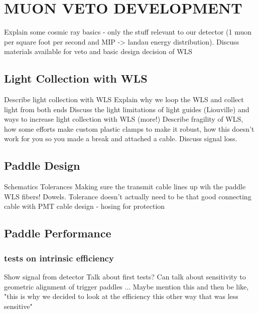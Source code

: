 %
%
%
%
%
%
%
%

%
%

\chapter{MUON VETO DEVELOPMENT}
\label{chap:muVeto}
Explain some cosmic ray basics - only the stuff relevant to our detector (1 muon per square foot per second and MIP -> landau energy distribution).
Discuss materials available for veto and basic design decision of WLS

\section{Light Collection with WLS}
Describe light collection with WLS
Explain why we loop the WLS and collect light from both ends
Discuss the light limitations of light guides (Liouville) and ways to increase light collection with WLS (more!)
Describe fragility of WLS, how some efforts make custom plastic clamps to make it robust, how this doesn't work for you so you made a break and attached a cable.  Discuss signal loss.

\section{Paddle Design}
Schematics
Tolerances
Making sure the transmit cable lines up wih the paddle WLS fibers!  Dowels.  Tolerance doesn't actually need to be that good
connecting cable with PMT
cable design - hosing for protection

\section{Paddle Performance}
\subsection{tests on intrinsic efficiency}
Show signal from detector
Talk about first tests?  Can talk about sensitivity to geometric alignment of trigger paddles ...
Maybe mention this and then be like, "this is why we decided to look at the efficiency this other way that was less sensitive"

